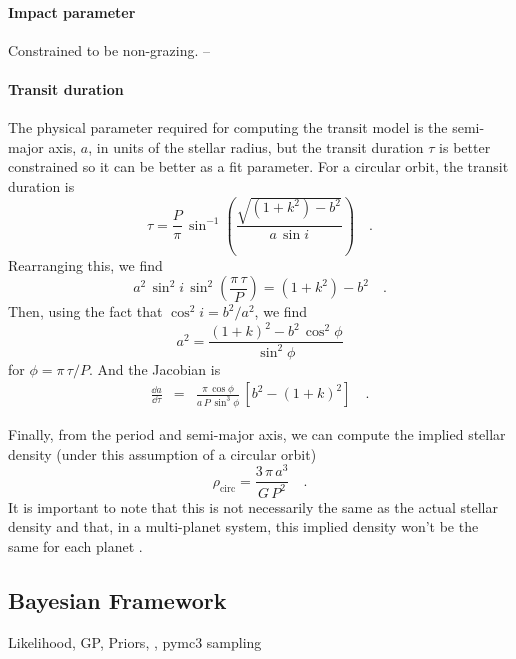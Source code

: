 \documentclass[linenumbers,floatfix,ApJL,twocolumn]{aastex631}
\begin{document}
\paragraph{Impact parameter}
Constrained to be non-grazing. -- 

\paragraph{Transit duration}
The physical parameter required for computing the transit model is the semi-major axis, $a$, in units of the stellar radius, but the transit duration $\tau$ is better constrained so it can be better as a fit parameter.
For a circular orbit, the transit duration is \citep{Winn:2010}
\begin{equation}
  \tau = \frac{P}{\pi}\,\sin^{-1}\left( \frac{\sqrt{(1 + k^2) - b^2}}{a\,\sin i} \right) \quad.
\end{equation}
Rearranging this, we find
\begin{equation}
  a^2\,\sin^2 i\,\sin^2\left(\frac{\pi\,\tau}{P}\right) = (1 + k^2) - b^2 \quad.
\end{equation}
Then, using the fact that $\cos^2 i = b^2 / a^2$, we find
\begin{equation}
  a^2 = \frac{(1 + k)^2 - b^2\,\cos^2\phi}{\sin^2\phi}
\end{equation}
for $\phi = \pi\,\tau / P$.
And the Jacobian is
\begin{eqnarray}
  \frac{\dd a}{\dd \tau} &=& \frac{\pi\,\cos \phi}{a\,P\,\sin^3 \phi}\,\left[b^2 - (1 + k)^2\right] \quad.
\end{eqnarray}

Finally, from the period and semi-major axis, we can compute the implied stellar density (under this assumption of a circular orbit)
\begin{equation}
  \rho_\mathrm{circ} = \frac{3\,\pi\,a^3}{G\,P^2} \quad.
\end{equation}
It is important to note that this is not necessarily the same as the actual stellar density and that, in a multi-planet system, this implied density won't be the same for each planet \citep[see, for example,][]{Dawson:2012, Kipping:2012}.




\subsection{Bayesian Framework}


Likelihood, GP, Priors, \celerite, pymc3 sampling
\end{document}
